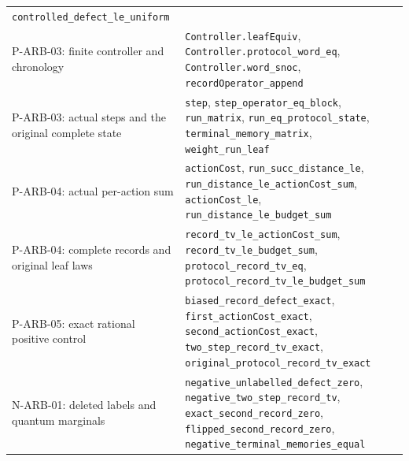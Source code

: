 \documentclass[
  11pt,
  oneside]{book}
\begin{document}
\begin{longtable}[]{@{}
  >{\raggedright\arraybackslash}p{}
  >{\raggedright\arraybackslash}p{}@{}}
\texttt{controlled\_\allowbreak defect\_\allowbreak le\_\allowbreak uniform} \\
P-ARB-03: finite controller and chronology &
\texttt{Controller.\allowbreak leaf\allowbreak Equiv}, \texttt{Controller.\allowbreak protocol\_\allowbreak word\_\allowbreak eq},
\texttt{Controller.\allowbreak word\_\allowbreak snoc}, \texttt{record\allowbreak Operator\_\allowbreak append} \\
P-ARB-03: actual steps and the original complete state & \texttt{step},
\texttt{step\_\allowbreak operator\_\allowbreak eq\_\allowbreak block}, \texttt{run\_\allowbreak matrix},
\texttt{run\_\allowbreak eq\_\allowbreak protocol\_\allowbreak state}, \texttt{terminal\_\allowbreak memory\_\allowbreak matrix},
\texttt{weight\_\allowbreak run\_\allowbreak leaf} \\
P-ARB-04: actual per-action sum & \texttt{action\allowbreak Cost},
\texttt{run\_\allowbreak succ\_\allowbreak distance\_\allowbreak le},
\texttt{run\_\allowbreak distance\_\allowbreak le\_\allowbreak action\allowbreak Cost\_\allowbreak sum}, \texttt{action\allowbreak Cost\_\allowbreak le},
\texttt{run\_\allowbreak distance\_\allowbreak le\_\allowbreak budget\_\allowbreak sum} \\
P-ARB-04: complete records and original leaf laws &
\texttt{record\_\allowbreak tv\_\allowbreak le\_\allowbreak action\allowbreak Cost\_\allowbreak sum},
\texttt{record\_\allowbreak tv\_\allowbreak le\_\allowbreak budget\_\allowbreak sum}, \texttt{protocol\_\allowbreak record\_\allowbreak tv\_\allowbreak eq},
\texttt{protocol\_\allowbreak record\_\allowbreak tv\_\allowbreak le\_\allowbreak budget\_\allowbreak sum} \\
P-ARB-05: exact rational positive control &
\texttt{biased\_\allowbreak record\_\allowbreak defect\_\allowbreak exact},
\texttt{first\_\allowbreak action\allowbreak Cost\_\allowbreak exact}, \texttt{second\_\allowbreak action\allowbreak Cost\_\allowbreak exact},
\texttt{two\_\allowbreak step\_\allowbreak record\_\allowbreak tv\_\allowbreak exact},
\texttt{original\_\allowbreak protocol\_\allowbreak record\_\allowbreak tv\_\allowbreak exact} \\
N-ARB-01: deleted labels and quantum marginals &
\texttt{negative\_\allowbreak unlabelled\_\allowbreak defect\_\allowbreak zero},
\texttt{negative\_\allowbreak two\_\allowbreak step\_\allowbreak record\_\allowbreak tv},
\texttt{exact\_\allowbreak second\_\allowbreak record\_\allowbreak zero},
\texttt{flipped\_\allowbreak second\_\allowbreak record\_\allowbreak zero},
\texttt{negative\_\allowbreak terminal\_\allowbreak memories\_\allowbreak equal} \\
\end{longtable}
\end{document}
